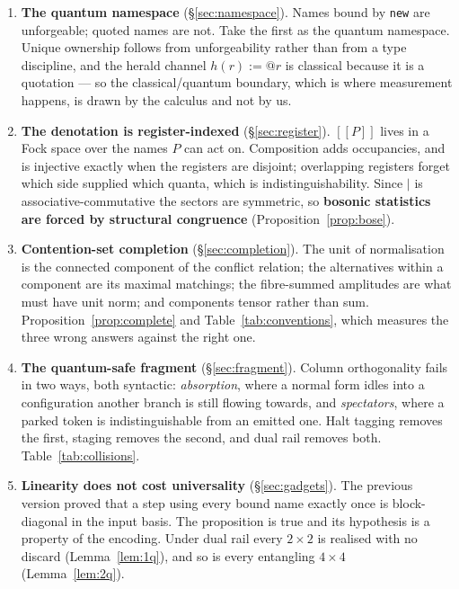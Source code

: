 \documentclass[11pt,a4paper]{article}
\theoremstyle{plain}
\theoremstyle{definition}
\theoremstyle{remark}
\newcommand{\sem}[1]{[\![#1]\!]}
\begin{document}
\begin{enumerate}[leftmargin=1.4em,itemsep=3pt]
\item \textbf{The quantum namespace} (\S\ref{sec:namespace}). Names bound by
\texttt{new} are unforgeable; quoted names are not. Take the first as the
quantum namespace. Unique ownership follows from unforgeability rather than from
a type discipline, and the herald channel $h(r) := @r$ is classical because it
is a quotation --- so the classical/quantum boundary, which is where measurement
happens, is drawn by the calculus and not by us.

\item \textbf{The denotation is register-indexed} (\S\ref{sec:register}).
$\sem{P}$ lives in a Fock space over the names $P$ can act on. Composition adds
occupancies, and is injective exactly when the registers are disjoint;
overlapping registers forget which side supplied which quanta, which is
indistinguishability. Since $\mid$ is associative-commutative the sectors are
symmetric, so \textbf{bosonic statistics are forced by structural congruence}
(Proposition~\ref{prop:bose}).

\item \textbf{Contention-set completion} (\S\ref{sec:completion}). The unit of
normalisation is the connected component of the conflict relation; the
alternatives within a component are its maximal matchings; the fibre-summed
amplitudes are what must have unit norm; and components tensor rather than sum.
Proposition~\ref{prop:complete} and Table~\ref{tab:conventions}, which measures
the three wrong answers against the right one.

\item \textbf{The quantum-safe fragment} (\S\ref{sec:fragment}). Column
orthogonality fails in two ways, both syntactic: \emph{absorption}, where a
normal form idles into a configuration another branch is still flowing towards,
and \emph{spectators}, where a parked token is indistinguishable from an emitted
one. Halt tagging removes the first, staging removes the second, and dual rail
removes both. Table~\ref{tab:collisions}.

\item \textbf{Linearity does not cost universality} (\S\ref{sec:gadgets}). The
previous version proved that a step using every bound name exactly once is
block-diagonal in the input basis. The proposition is true and its hypothesis is
a property of the encoding. Under dual rail every $2\times 2$ is realised with
no discard (Lemma~\ref{lem:1q}), and so is every entangling $4\times4$
(Lemma~\ref{lem:2q}).


\end{enumerate}
\end{document}
